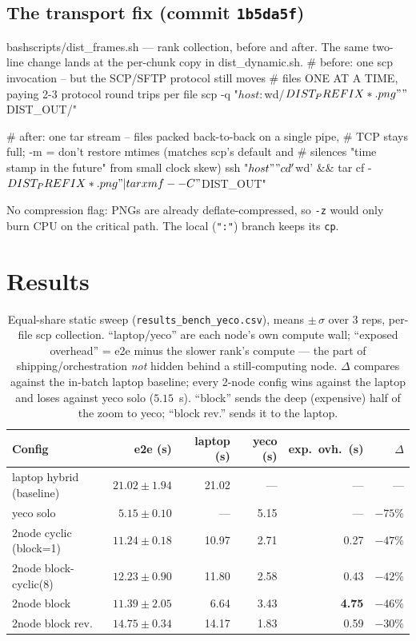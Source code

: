 \documentclass[
	english,
	letterpaper, oneside
]{article}
\begin{document}
\subsection{The transport fix (commit \texttt{1b5da5f})}
\label{sec:fix}

\begin{sourcecode}{bash}{scripts/dist\_frames.sh --- rank collection, before and after. The same two-line change lands at the per-chunk copy in dist\_dynamic.sh.}
# before: one scp invocation -- but the SCP/SFTP protocol still moves
# files ONE AT A TIME, paying 2-3 protocol round trips per file
scp -q "$host:$wd/${DIST_PREFIX}*.png" "$DIST_OUT/"

# after: one tar stream -- files packed back-to-back on a single pipe,
# TCP stays full; -m = don't restore mtimes (matches scp's default and
# silences "time stamp in the future" from small clock skew)
ssh "$host" "cd '$wd' && tar cf - ${DIST_PREFIX}*.png" | tar xmf - -C "$DIST_OUT"
\end{sourcecode}

No compression flag: PNGs are already deflate-compressed, so \texttt{-z}
would only burn CPU on the critical path. The local (\texttt{":"}) branch
keeps its \texttt{cp}.

\section{Results}
\label{sec:results}

\begin{table}[H]
\centering
\caption{Equal-share static sweep (\texttt{results\_bench\_yeco.csv}),
means $\pm\,\sigma$ over 3 reps, per-file scp collection. ``laptop/yeco''
are each node's own compute wall; ``exposed overhead'' = e2e minus the
slower rank's compute --- the part of shipping/orchestration \emph{not}
hidden behind a still-computing node. $\Delta$ compares against the
in-batch laptop baseline; every 2-node config wins against the laptop and
loses against yeco solo ($5.15$~s). ``block'' sends the deep (expensive)
half of the zoom to yeco; ``block rev.'' sends it to the
laptop.\label{tab:static}}
\footnotesize
\setlength{\tabcolsep}{4.5pt}
\begin{tabular}{lrrrrr}
\toprule
Config & e2e (s) & laptop (s) & yeco (s) & exp.\ ovh.\ (s) & $\Delta$ \\
\midrule
laptop hybrid (baseline) & $21.02\pm1.94$ & 21.02 & --- & --- & --- \\
yeco solo                & $\mathbf{5.15\pm0.10}$ & --- & 5.15 & --- & $-75\%$ \\
2node cyclic (block=1)   & $\mathbf{11.24\pm0.18}$ & 10.97 & 2.71 & 0.27 & $-47\%$ \\
2node block-cyclic(8)    & $12.23\pm0.90$ & 11.80 & 2.58 & 0.43 & $-42\%$ \\
2node block              & $11.39\pm2.05$ & 6.64 & 3.43 & \textbf{4.75} & $-46\%$ \\
2node block rev.         & $14.75\pm0.34$ & 14.17 & 1.83 & 0.59 & $-30\%$ \\
\bottomrule
\end{tabular}
\end{table}
\end{document}
